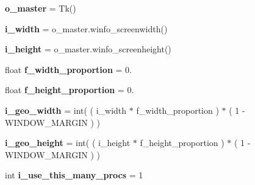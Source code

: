 \begin{DoxyCompactItemize}
\item 
{\bfseries o\+\_\+master} = Tk()\hypertarget{namespacenegui_1_1pghostnotebook_a87f3638cc6a59f9037d9f965f0f37538}{}\label{namespacenegui_1_1pghostnotebook_a87f3638cc6a59f9037d9f965f0f37538}

\item 
{\bfseries i\+\_\+width} = o\+\_\+master.\+winfo\+\_\+screenwidth()\hypertarget{namespacenegui_1_1pghostnotebook_abb662bea4c9bf9d4a5fe42c4fb4b4ed6}{}\label{namespacenegui_1_1pghostnotebook_abb662bea4c9bf9d4a5fe42c4fb4b4ed6}

\item 
{\bfseries i\+\_\+height} = o\+\_\+master.\+winfo\+\_\+screenheight()\hypertarget{namespacenegui_1_1pghostnotebook_abfedf6f0e0f6f989eba30fd49babff1d}{}\label{namespacenegui_1_1pghostnotebook_abfedf6f0e0f6f989eba30fd49babff1d}

\item 
float {\bfseries f\+\_\+width\+\_\+proportion} = 0.\hypertarget{namespacenegui_1_1pghostnotebook_a5ab5731364fab355fcdac3a12527a46a}{}\label{namespacenegui_1_1pghostnotebook_a5ab5731364fab355fcdac3a12527a46a}

\item 
float {\bfseries f\+\_\+height\+\_\+proportion} = 0.\hypertarget{namespacenegui_1_1pghostnotebook_adee69321e2e8b3e63c9d030880748c79}{}\label{namespacenegui_1_1pghostnotebook_adee69321e2e8b3e63c9d030880748c79}

\item 
{\bfseries i\+\_\+geo\+\_\+width} = int( ( i\+\_\+width $\ast$ f\+\_\+width\+\_\+proportion ) $\ast$ ( 1 -\/ W\+I\+N\+D\+O\+W\+\_\+\+M\+A\+R\+G\+IN ) )\hypertarget{namespacenegui_1_1pghostnotebook_a999255d83a1b5a0fa4eb9637eed7a597}{}\label{namespacenegui_1_1pghostnotebook_a999255d83a1b5a0fa4eb9637eed7a597}

\item 
{\bfseries i\+\_\+geo\+\_\+height} = int( ( i\+\_\+height $\ast$ f\+\_\+height\+\_\+proportion ) $\ast$ ( 1 -\/ W\+I\+N\+D\+O\+W\+\_\+\+M\+A\+R\+G\+IN ) )\hypertarget{namespacenegui_1_1pghostnotebook_a3f20501fe15d8b5209094a4faea61d0c}{}\label{namespacenegui_1_1pghostnotebook_a3f20501fe15d8b5209094a4faea61d0c}

\item 
int {\bfseries i\+\_\+use\+\_\+this\+\_\+many\+\_\+procs} = 1\hypertarget{namespacenegui_1_1pghostnotebook_a441515e865818dcb1e4dad534fd174e8}{}\label{namespacenegui_1_1pghostnotebook_a441515e865818dcb1e4dad534fd174e8}


\end{DoxyCompactItemize}
